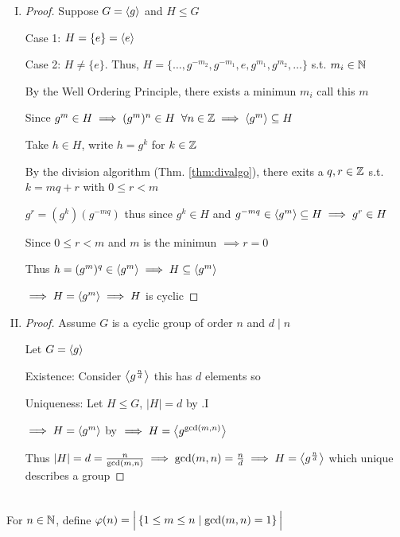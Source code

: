 \begin{enumerate}[I.]
    \item \begin{proof}
        Suppose $G=\left\langle g \right\rangle$ and $H \leq G$

        Case 1: $H=\left\{ e \right\}=\left\langle e \right\rangle$ \checkmark

        Case 2: $H \neq \{e\}$.
        Thus, $H=\{\ldots, g^{-m_2},g^{-m_1},e,g^{m_1},g^{m_2},\ldots\}$ s.t. $m_i\in\mathbb{N}$

        By the Well Ordering Principle, there exists a minimun $m_i$ call this $m$

        Since $g^m\in H \implies (g^m)^n \in H\;\;\forall n\in\mathbb{Z} \implies \left\langle g^m \right\rangle\subseteq H$

        Take $h\in H$, write $h=g^k$ for $k \in \mathbb{Z}$

        By the division algorithm (Thm. \ref{thm:divalgo}), there exits a $q,r \in \mathbb{Z}$ s.t.\\
        $k=mq+r$ with $0\leq r<m$

        $g^r=(g^{k})(g^{-mq})$ thus since $g^k\in H$ and $g^{-mq}\in \left\langle g^m \right\rangle\subseteq H \implies g^r\in H$

        Since $0\leq r < m$ and $m$ is the minimun $\implies r=0$

        Thus $h=(g^m)^q\in\left\langle g^m \right\rangle \implies H \subseteq \left\langle g^m \right\rangle$

        $\implies H=\left\langle g^m \right\rangle\implies H$ is cyclic
    \end{proof}
    \item \begin{proof}
        Assume $G$ is a cyclic group of order $n$ and $d\mid n$

        Let $G=\left\langle g \right\rangle$

        Existence: Consider $\left\langle g^{\frac{n}{d}} \right\rangle$ this has $d$ elements so \checkmark

        Uniqueness: Let $H \leq G$, $|H|=d$ by .I 
        
        $\implies H=\left\langle g^m \right\rangle$ by  $\implies H=\left\langle g^{\text{gcd}(m,n)} \right\rangle$

        Thus $|H|=d=\frac{n}{\text{gcd}(m,n)} \implies \text{gcd}(m,n)=\frac{n}{d} \implies H=\left\langle g^\frac{n}{d} \right\rangle$ which unique describes a group
    \end{proof}
\end{enumerate}

\begin{definition}
    \phantom{text}\\
    For $n\in\mathbb{N}$, define $\varphi(n)=\Big|\left\{ 1\leq m \leq n \mid \text{gcd}(m,n)=1 \right\}\Big|$
\end{definition}

